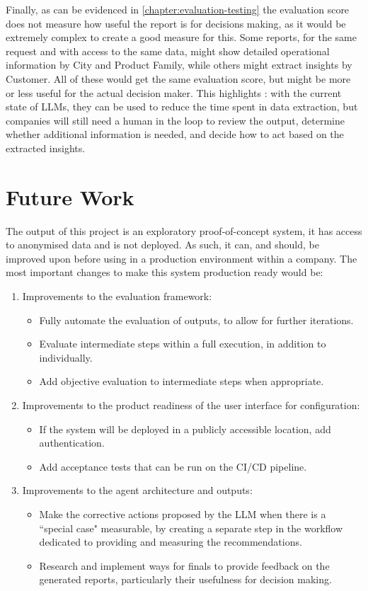 \documentclass[a4paper]{report}
\begin{document}
Finally, as can be evidenced in \autoref{chapter:evaluation-testing} the evaluation score does not measure how useful the report is for decisions making, as it would be extremely complex to create a good measure for this. Some reports, for the same request and with access to the same data, might show detailed operational information by City and Product Family, while others might extract insights by Customer. All of these would get the same evaluation score, but might be more or less useful for the actual decision maker. This highlights \kfid : with the current state of LLMs, they can be used to reduce the time spent in data extraction, but companies will still need a human in the loop to review the output, determine whether additional information is needed, and decide how to act based on the extracted insights.

\section{Future Work}
\label{sec:future-work}

The output of this project is an exploratory proof-of-concept system, it has access to anonymised data and is not deployed. As such, it can, and should, be improved upon before using in a production environment within a company. The most important changes to make this system production ready would be:

\begin{enumerate}
    \item Improvements to the evaluation framework:
    \begin{itemize}
        \item Fully automate the evaluation of outputs, to allow for further iterations.
        \item Evaluate intermediate steps within a full execution, in addition to individually.
        \item Add objective evaluation to intermediate steps when appropriate.
    \end{itemize}
    \item Improvements to the product readiness of the user interface for configuration:
    \begin{itemize}
        \item If the system will be deployed in a publicly accessible location, add authentication.
        \item Add acceptance tests that can be run on the CI/CD pipeline.
    \end{itemize}
    \item Improvements to the agent architecture and outputs:
    \begin{itemize}
        \item Make the corrective actions proposed by the LLM when there is a ``special case" measurable, by creating a separate step in the workflow dedicated to providing and measuring the recommendations.
        \item Research and implement ways for finals to provide feedback on the generated reports, particularly their usefulness for decision making.
    \end{itemize}
\end{enumerate}
\end{document}
